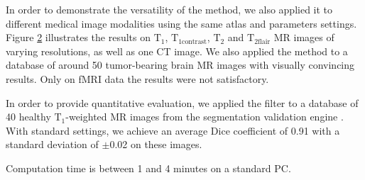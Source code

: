\documentclass{InsightArticle}
\begin{document}
\begin{figure}[h]
\center
{}
\label{fig:brainweb}
\end{figure}

\newpage

In order to demonstrate the versatility of the method, we also applied it to different medical image modalities using the same atlas and parameters settings. Figure \ref{fig:modalities} illustrates the results on $\mathrm{T_1}$, $\mathrm{T_{1contrast}}$, $\mathrm{T_2}$ and $\mathrm{T_{2flair}}$ MR images of varying resolutions, as well as one CT image. We also applied the method to a database of around 50 tumor-bearing brain MR images with visually convincing results. Only on fMRI data the results were not satisfactory. 

\begin{figure}[h]
\center
{}
\label{fig:modalities}
\end{figure}

In order to provide quantitative evaluation, we applied the filter to a database of 40 healthy $\mathrm{T_1}$-weighted MR images from the segmentation validation engine \cite{Shattuck2009}. With standard settings, we achieve an average Dice coefficient of 0.91 with a standard deviation of $\pm$0.02 on these images.

Computation time is between 1 and 4 minutes on a standard PC.
\end{document}
